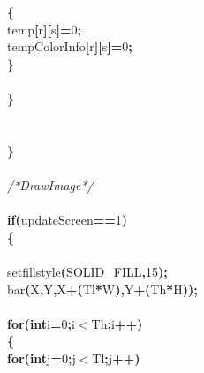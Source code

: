 \documentclass[a4paper, 10pt]{article}
\newcommand\SPC{\hspace*{0.6em}}
\newcommand{\CppAComment}[1]{\textit{\textcolor[rgb]{0.2,0.6,1}{#1}}}
\newcommand{\CppAIdentifier}[1]{#1}
\newcommand{\CppANumber}[1]{\textcolor[rgb]{0.5,0,0.5}{#1}}
\newcommand{\CppAReservedWord}[1]{\textbf{#1}}
\newcommand{\CppASpace}[1]{\colorbox[rgb]{1,1,1}{#1}}
\newcommand{\CppASymbol}[1]{\textbf{\textcolor[rgb]{1,0,0}{#1}}}
\begin{document}
\begin{ttfamily}
\CppASpace{\SPC \SPC \SPC \SPC }\CppASymbol{\{}\\
\CppASpace{\SPC \SPC \SPC \SPC \SPC }\CppAIdentifier{temp}\CppASymbol{[}\CppAIdentifier{r}\CppASymbol{]}\CppASymbol{[}\CppAIdentifier{s}\CppASymbol{]}\CppASymbol{=}\CppANumber{0}\CppASymbol{;}\\
\CppASpace{\SPC \SPC \SPC \SPC \SPC }\CppAIdentifier{tempColorInfo}\CppASymbol{[}\CppAIdentifier{r}\CppASymbol{]}\CppASymbol{[}\CppAIdentifier{s}\CppASymbol{]}\CppASymbol{=}\CppANumber{0}\CppASymbol{;}\\
\CppASpace{\SPC \SPC \SPC \SPC }\CppASymbol{\}}\\
\\
\CppASpace{\SPC \SPC }\CppASymbol{\}}\\
\\
\\
\CppASpace{\SPC }\CppASymbol{\}}\\
\\
\CppASpace{\SPC }\CppAComment{/*\SPC Draw\SPC Image\SPC */}\\
\\
\CppASpace{\SPC }\CppAReservedWord{if}\CppASymbol{(}\CppAIdentifier{updateScreen}\CppASymbol{==}\CppANumber{1}\CppASymbol{)}\\
\CppASpace{\SPC }\CppASymbol{\{}\\
\\
\CppASpace{\SPC \SPC }\CppAIdentifier{setfillstyle}\CppASymbol{(}\CppAIdentifier{SOLID\_FILL}\CppASymbol{,}\CppANumber{15}\CppASymbol{)}\CppASymbol{;}\\
\CppASpace{\SPC \SPC }\CppAIdentifier{bar}\CppASymbol{(}\CppAIdentifier{X}\CppASymbol{,}\CppAIdentifier{Y}\CppASymbol{,}\CppAIdentifier{X}\CppASymbol{+}\CppASymbol{(}\CppAIdentifier{Tl}\CppASymbol{*}\CppAIdentifier{W}\CppASymbol{)}\CppASymbol{,}\CppAIdentifier{Y}\CppASymbol{+}\CppASymbol{(}\CppAIdentifier{Th}\CppASymbol{*}\CppAIdentifier{H}\CppASymbol{)}\CppASymbol{)}\CppASymbol{;}\\
\\
\CppASpace{\SPC \SPC }\CppAReservedWord{for}\CppASymbol{(}\CppAReservedWord{int}\CppASpace{\SPC }\CppAIdentifier{i}\CppASymbol{=}\CppANumber{0}\CppASymbol{;}\CppAIdentifier{i}\CppASymbol{$<$}\CppAIdentifier{Th}\CppASymbol{;}\CppAIdentifier{i}\CppASymbol{++}\CppASymbol{)}\\
\CppASpace{\SPC \SPC }\CppASymbol{\{}\\
\CppASpace{\SPC \SPC \SPC }\CppAReservedWord{for}\CppASymbol{(}\CppAReservedWord{int}\CppASpace{\SPC }\CppAIdentifier{j}\CppASymbol{=}\CppANumber{0}\CppASymbol{;}\CppAIdentifier{j}\CppASymbol{$<$}\CppAIdentifier{Tl}\CppASymbol{;}\CppAIdentifier{j}\CppASymbol{++}\CppASymbol{)}\\

\end{ttfamily}
\end{document}
